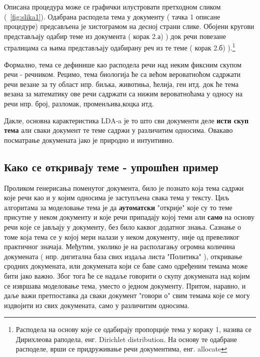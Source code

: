 Описана процедура може се графички илустровати претходном сликом (~\ref{fig:slika1}). Одабрана расподела тема у документу ( тачка 1 описане процедуре) предсављена је хистограмом на десној страни слике. Обојени кругови представљају одабир теме из документа ( корак 2.а) ) док речи повезане стралицама са њима представљају одабирану реч из те теме ( корак 2.б) ).\footnote{Расподела на основу које се одабирају пропорције тема у кораку 1, назива се Дирихлеова раподела, енг. Dirichlet distribution. На основу те одабране расподеле, врши се придруживање речи документима, енг. allocate } 

Формално, тема се дефинише као расподела речи над неким фиксним скупом речи - речником. Рецимо, тема биологија ће са већом вероватноћом садржати речи везане за ту област нпр. биљка, животиња, ћелија, ген итд. док ће тема везана за математику ове речи садржати са нижим вероватноћама у односу на речи нпр. број, разломак, променљива,коцка итд.



Дакле, основна карактеристика LDA-a је то што сви документи деле \textbf{исти скуп тема} али сваки документ те теме садржи у различитим односима. Овакаво посматрање докумената јако је природно и интуитивно.%

\subsection{Како се откривају теме - упрошћен пример }

Проликом генерисања поменутог документа, било је познато која тема садржи које речи као и у којим односима је заступљена свака тема у тексту. Циљ алгоритама за моделовање тема је да \textbf{аутоматски} "открије"  које су то теме присутне у неком документу и које речи припадају којој теми али \textbf{само} на основу речи које се јављају у документу, без било каквог додатног знања.
Сазнање о томе која тема се у којој мери налази у неком документу, није од превеликог практичног значаја. Међутим, уколико је на располагању огромна количина докумената ( нпр. дигитална база свих издаља листа "Политика" ), откривање сродних докумената, или докумената који се баве само одређеним темама може бити јако важно. Због тога ће се надаље говорити о скупу докумената над којим се извршава моделовање тема, уместо о једном документу. Притом, наравно, и даље важи претпоставка да сваки документ "говори о"   свим темама које се могу издвојити из свих докумената, само у различитим односима.

